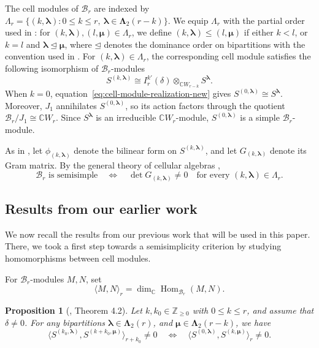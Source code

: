 \documentclass[10pt,a4paper]{amsart}
\newtheorem{proposition}[theorem]{Proposition}
\DeclareMathOperator {\Hom}{Hom}
\newcommand{\C}{\mathbb{C}}
\newcommand{\1}{\mathfrak{1}}
\newcommand{\B}{\mathcal{B}}
\begin{document}
The cell modules of $\B_r$ are indexed by
$\Lambda_r=\{(k,\bm\lambda):0\leq k\leq r,\ \bm\lambda\in\bm\Lambda_2(r-k)\}$. We equip $\Lambda_r$ with the partial order used in \cite[Section~2.2]{KCTprevious}: for $(k,\bm\lambda),(l,\bm\mu)\in\Lambda_r$, we define $(k,\bm\lambda)\leq(l,\bm\mu)$ if either $k<l$, or $k=l$ and $\bm\lambda\unlhd\bm\mu$, where $\unlhd$ denotes the dominance order on bipartitions with the convention used in \cite[Section~2.1]{KCTprevious}. For $(k,\bm\lambda)\in\Lambda_r$, the corresponding cell module satisfies the following isomorphism of $\B_r$-modules
\begin{equation}
 S^{(k,\bm\lambda)}\cong I_r^{k'}(\delta)\otimes_{\C W_{r-k}}S^{\bm\lambda}.
 \label{eq:cell-module-realization-new}
\end{equation}
When $k=0$, equation~\eqref{eq:cell-module-realization-new} gives
$S^{(0,\bm\lambda)}\cong S^{\bm\lambda}$. Moreover, $J_1$ annihilates $S^{(0,\bm\lambda)}$, so its action factors through the quotient $\B_r/J_1\cong\C W_r$. Since $S^{\bm\lambda}$ is an irreducible $\C W_r$-module, $S^{(0,\bm\lambda)}$ is a simple $\B_r$-module.

As in \cite[Subsection~2.2]{KCTprevious}, let
$\phi_{(k,\bm\lambda)}$ denote the bilinear form
on $S^{(k,\bm\lambda)}$, and let $G_{(k,\bm\lambda)}$
denote its Gram matrix. By the general theory of cellular algebras
\cite{GL96},
\begin{equation}
\B_r\text{ is semisimple}
\quad\Longleftrightarrow\quad
 \det G_{(k,\bm\lambda)}\neq0
 \quad\text{for every }(k,\bm\lambda)\in\Lambda_r.
 \label{eq:cellular-semisimplicity}
\end{equation}

\subsection{Results from our earlier work \cite{KCTprevious}}

We now recall the results from our previous work \cite{KCTprevious} that will be used in this paper. There, we took a first step towards a semisimplicity criterion by studying homomorphisms between cell modules.

For $\B_r$-modules $M,N$, set
$$
 \langle M,N\rangle_r=\dim_{\C}\Hom_{\B_r}(M,N).
$$

\begin{proposition}[\cite{KCTprevious}, Theorem 4.2]
\label{prop:shift-pairing}
Let $k,k_0\in\mathbb Z_{\geq0}$ with $0\leq k\leq r$, and assume
that $\delta\neq0$. For any bipartitions $\bm{\lambda} \in \bm{\Lambda}_2(r)$, and $\bm{\mu} \in \bm{\Lambda}_2(r-k)$, we have
$$\langle S^{(k_{0}, \bm{\lambda})}, S^{(k+k_{0},\bm{\mu})}\rangle_{r+k_{0}}\neq 0 \quad\Longleftrightarrow\quad \langle S^{(0, \bm{\lambda})}, S^{(k,\bm{\mu})}\rangle_{r}\neq 0. $$
\end{proposition}
\end{document}
